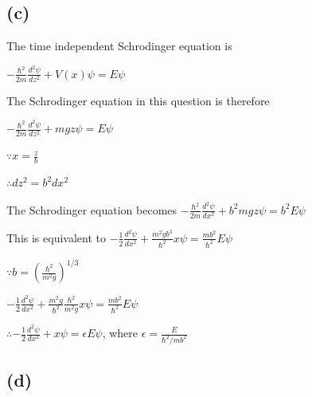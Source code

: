\documentclass[12pt]{article}
\begin{document}
\begin{spacing}{2.0}
\subsection*{(c)}

The time independent Schrodinger equation is

$-\frac{\hbar^2}{2m} \frac{d^2 \psi}{d z^2} + V(x)\psi = E \psi $

The Schrodinger equation in this question is therefore

$-\frac{\hbar^2}{2m} \frac{d^2 \psi}{d z^2} + mgz \psi = E \psi$

$\because x=\frac{z}{b}$

$\therefore dz^2 = b^2 dx^2$

The Schrodinger equation becomes $-\frac{\hbar^2}{2m} \frac{d^2 \psi}{d x^2} +  b^2 mgz \psi = b^2 E \psi$

This is equivalent to $-\frac{1}{2} \frac{d^2 \psi}{d x^2} +  \frac{m^2 g b^3}{\hbar^2} x\psi = \frac{m b^2}{\hbar^2} E \psi$

$\because b=\left( \frac{\hbar^2}{m^2 g} \right)^{1/3}$

$-\frac{1}{2} \frac{d^2 \psi}{d x^2} +  \frac{m^2 g }{\hbar^2} \frac{\hbar^2}{m^2 g} x\psi = \frac{m b^2}{\hbar^2} E \psi$

$\therefore -\frac{1}{2} \frac{d^2 \psi}{d x^2} + x\psi = \epsilon E \psi$, where $\epsilon = \frac{E}{\hbar^2/mb^2}$

\subsection*{(d)}

%
%
%
%
%



\end{spacing}
\end{document}
